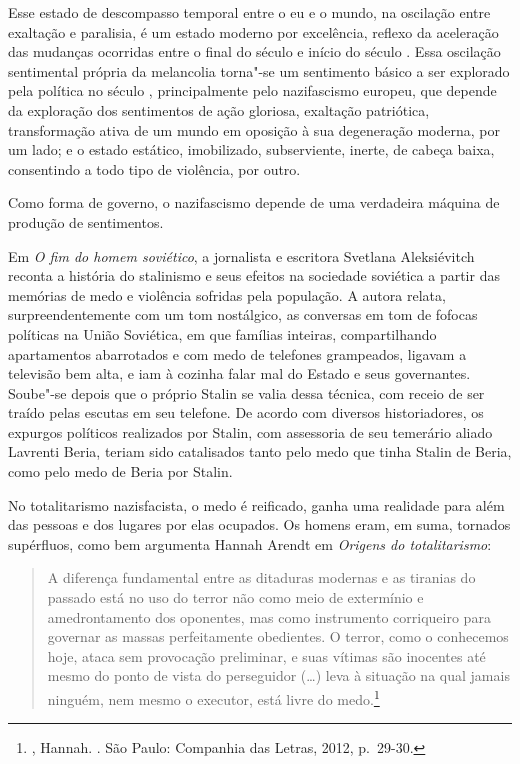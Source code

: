 Esse estado de descompasso temporal entre o eu e o mundo, na oscilação
entre exaltação e paralisia, é um estado moderno por excelência,
reflexo da aceleração das
mudanças ocorridas entre o final do século  e início do século .
Essa oscilação sentimental própria da melancolia torna"-se um sentimento
básico a ser explorado pela política no século , principalmente pelo
nazifascismo europeu, que depende da exploração dos sentimentos de ação
gloriosa, exaltação patriótica, transformação ativa de um mundo em
oposição à sua degeneração moderna, por um lado; e o estado estático,
imobilizado, subserviente, inerte, de cabeça baixa, consentindo a todo
tipo de violência, por outro.

Como forma de governo, o nazifascismo depende de uma verdadeira máquina
de produção de sentimentos.

\asterisc

Em \emph{O fim do homem soviético}, a jornalista e escritora Svetlana
Aleksiévitch reconta a história do stalinismo e seus efeitos na sociedade
soviética a partir das memórias de medo e violência sofridas pela
população. A autora relata, surpreendentemente com um tom nostálgico, as
conversas em tom de fofocas políticas na União Soviética, em que
famílias inteiras, compartilhando apartamentos abarrotados e com medo de
telefones grampeados, ligavam a televisão bem alta, e iam à cozinha
falar mal do Estado e seus governantes. Soube"-se depois que o próprio Stalin se valia dessa
técnica, com receio de ser traído pelas escutas em seu telefone. De
acordo com diversos historiadores, os expurgos políticos realizados por
Stalin, com assessoria de seu temerário aliado Lavrenti Beria, teriam
sido catalisados tanto pelo medo que tinha Stalin de Beria, como pelo
medo de Beria por Stalin.

No totalitarismo nazisfacista, o medo é reificado, ganha uma realidade
para além das pessoas e dos lugares por elas ocupados. Os homens eram,
em suma, tornados supérfluos, como bem argumenta Hannah Arendt em
\emph{Origens do totalitarismo}:

\begin{quote}
A diferença fundamental entre as ditaduras modernas e as tiranias do
passado está no uso do terror não como meio de extermínio e
amedrontamento dos oponentes, mas como instrumento corriqueiro para
governar as massas perfeitamente obedientes. O terror, como o conhecemos
hoje, ataca sem provocação preliminar, e suas vítimas são inocentes até
mesmo do ponto de vista do perseguidor (\ldots{}) leva à situação na qual
jamais ninguém, nem mesmo o executor, está livre do medo.\footnote{,
  Hannah. {}. São Paulo: Companhia das Letras, 2012, p.~29-30.}
\end{quote}

